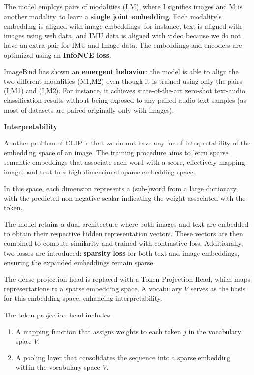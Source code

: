 The model employs pairs of modalities (I,M), where I signifies images and M is another modality, to learn a \textbf{single joint embedding}. Each modality’s embedding is aligned with image embeddings, for instance, text is aligned with images using web data, and IMU data is aligned with video because we do not have an extra-pair for IMU and Image data. The embeddings and encoders are optimized using an \textbf{InfoNCE loss}.

ImageBind has shown an \textbf{emergent behavior}: the model is able to align the two different modalities
(M1,M2) even though it is trained using only the pairs (I,M1) and (I,M2). For instance,
it achieves state-of-the-art zero-shot text-audio classification results without being
exposed to any paired audio-text samples (as most of datasets are paired originally only with images).


\textbf{Interpretability}

Another problem of CLIP is that we do not have any for of interpretability of the embedding space of an image. 
The training procedure aims to learn sparse semantic embeddings that associate each word with a score, effectively mapping images and text to a high-dimensional sparse embedding space.

In this space, each dimension represents a (sub-)word from a large dictionary, with the predicted non-negative scalar indicating the weight associated with the token.

The model retains a dual architecture where both images and text are embedded to obtain their respective hidden representation vectors. These vectors are then combined to compute similarity and trained with contrastive loss. Additionally, two losses are introduced: \textbf{sparsity loss} for both text and image embeddings, ensuring the expanded embeddings remain sparse.

The dense projection head is replaced with a Token Projection Head, which maps representations to a sparse embedding space. A vocabulary $ V $ serves as the basis for this embedding space, enhancing interpretability.

The token projection head includes:
\begin{enumerate}
    \item A mapping function that assigns weights to each token $ j $ in the vocabulary space $V $.
    \item A pooling layer that consolidates the sequence into a sparse embedding within the vocabulary space $ V $.
\end{enumerate}

